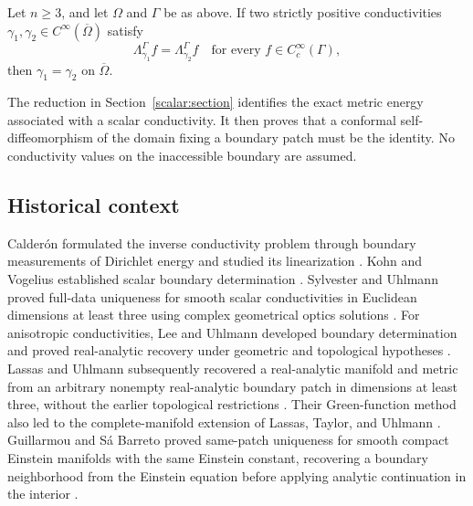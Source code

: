 \begin{corollary}
\label{main:scalar}
Let $n\ge3$, and let $\Omega$ and $\Gamma$ be as above.  If two
strictly positive conductivities
$\gamma_1,\gamma_2\in C^\infty(\overline\Omega)$ satisfy
\[
 \Lambda_{\gamma_1}^\Gamma f=\Lambda_{\gamma_2}^\Gamma f
       \quad\text{for every }f\in C_c^\infty(\Gamma),
\]
then $\gamma_1=\gamma_2$ on $\overline\Omega$.
\end{corollary}

The reduction in Section~\ref{scalar:section} identifies the exact
metric energy associated with a scalar conductivity.  It then proves
that a conformal self-diffeomorphism of the domain fixing a boundary
patch must be the identity.  No conductivity values on the inaccessible
boundary are assumed.

\subsection{Historical context}

Calder\'on formulated the inverse conductivity problem through boundary
measurements of Dirichlet energy and studied its linearization
\cite{Calderon1980}. Kohn and Vogelius established scalar boundary
determination \cite{KohnVogelius1984}. Sylvester and Uhlmann proved
full-data uniqueness for smooth scalar conductivities in Euclidean
dimensions at least three using complex geometrical optics solutions
\cite{SylvesterUhlmann1987}. For anisotropic conductivities, Lee and
Uhlmann developed boundary determination and proved real-analytic
recovery under geometric and topological hypotheses
\cite{LeeUhlmann1989}. Lassas and Uhlmann subsequently recovered a
real-analytic manifold and metric from an arbitrary nonempty
real-analytic boundary patch in dimensions at least three, without
the earlier topological restrictions
\cite[Theorem~1.1(ii)]{LassasUhlmann2001}. Their Green-function method
also led to the complete-manifold extension of Lassas, Taylor, and
Uhlmann \cite{LassasTaylorUhlmann2003}. Guillarmou and S\'a Barreto
proved same-patch uniqueness for smooth compact Einstein manifolds
with the same Einstein constant, recovering a boundary neighborhood
from the Einstein equation before applying analytic continuation in
the interior \cite[Theorem~1.1]{GuillarmouSaBarreto2009}.


